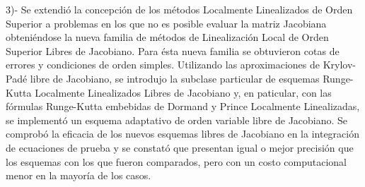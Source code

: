 \begin{conclusions}

    3)- Se extendió la concepción de los métodos Localmente Linealizados de Orden Superior a problemas en los que no es posible evaluar la matriz Jacobiana obteniéndose la nueva familia de métodos de  Linealización Local de Orden Superior Libres de Jacobiano. Para ésta nueva familia se obtuvieron cotas de errores y condiciones de orden simples. Utilizando las aproximaciones de Krylov-Padé libre de Jacobiano, se introdujo la subclase particular de esquemas Runge-Kutta Localmente Linealizados Libres de Jacobiano y, en paticular, con las fórmulas Runge-Kutta embebidas de Dormand y  Prince Localmente Linealizadas, se implementó un esquema adaptativo de orden variable libre de Jacobiano. Se comprobó la eficacia de los nuevos esquemas libres de Jacobiano en la integración de ecuaciones de prueba y se constató que presentan igual o mejor precisión que los esquemas con los que fueron comparados, pero con un costo computacional menor en la mayoría de los casos. 
    



\end{conclusions}
